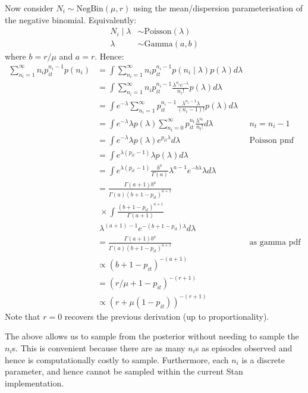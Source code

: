 \documentclass[main.tex]{subfiles}
\begin{document}
Now consider $N_i \sim \text{NegBin}(\mu, r)$ using the
mean/dispersion parameterisation of the negative binomial. Equivalently:
\begin{align}
N_i \mid \lambda &\sim \text{Poisson}(\lambda) \\
\lambda &\sim \text{Gamma}(a, b)
\end{align}
where $b = r / \mu$ and $a = r$.
Hence:
\begin{align}
\sum_{n_i=1}^\infty n_i p_{it}^{n_i- 1} p(n_i) 
&= \int \sum_{n_i=1}^\infty n_i p_{it}^{n_i- 1} p(n_i \mid \lambda) p(\lambda) d\lambda \\
&= \int \sum_{n_i=1}^\infty n_i p_{it}^{n_i- 1} \frac{\lambda^{n_i} e^{-\lambda}}{n_i!} p(\lambda) d\lambda \\
&= \int e^{-\lambda} \sum_{n_i=1}^\infty p_{it}^{n_i- 1} \frac{\lambda^{n_i-1}\lambda }{(n_i-1)!} p(\lambda) d\lambda \\
&= \int e^{-\lambda} \lambda p(\lambda) \sum_{n_t=0}^\infty p_{it}^{n_t} \frac{\lambda^{n_t} }{n_t!} d\lambda &n_t = n_i - 1 \\
&= \int e^{-\lambda} \lambda p(\lambda) e^{p_{it}\lambda} d\lambda &\text{Poisson pmf} \\
&= \int e^{\lambda (p_{it} - 1)} \lambda p(\lambda) d\lambda \\
&= \int e^{\lambda (p_{it} - 1)} \frac{b^a}{\Gamma(a)} \lambda^{a-1} e^{-b\lambda} \lambda d\lambda \\
&= \frac{\Gamma(a+1)b^a}{\Gamma(a) (b+1-p_{it})^{a+1}} \\ 
  &\; \times \int \frac{(b+1-p_{it})^{a+1}}{\Gamma(a+1)} \\
  &\; \lambda^{(a+1)-1} e^{-(b+1-p_{it})\lambda} d\lambda \\
&= \frac{\Gamma(a+1)b^a}{\Gamma(a) (b+1-p_{it})^{a+1}} &\text{as gamma pdf} \\
&\propto (b+1-p_{it})^{-(a+1)} \\
&= (r/\mu+1-p_{it})^{-(r+1)} \\
&\propto (r+\mu (1-p_{it}))^{-(r+1)}
\end{align}
Note that $r=0$ recovers the previous derivation (up to
proportionality).

The above allows us to sample from the posterior without needing to
sample the $n_i$s. This is convenient because there are as many
$n_i$s as episodes observed and hence is computationally costly to
sample. Furthermore, each $n_i$ is a discrete parameter, and hence
cannot be sampled within the current Stan implementation.
\end{document}
